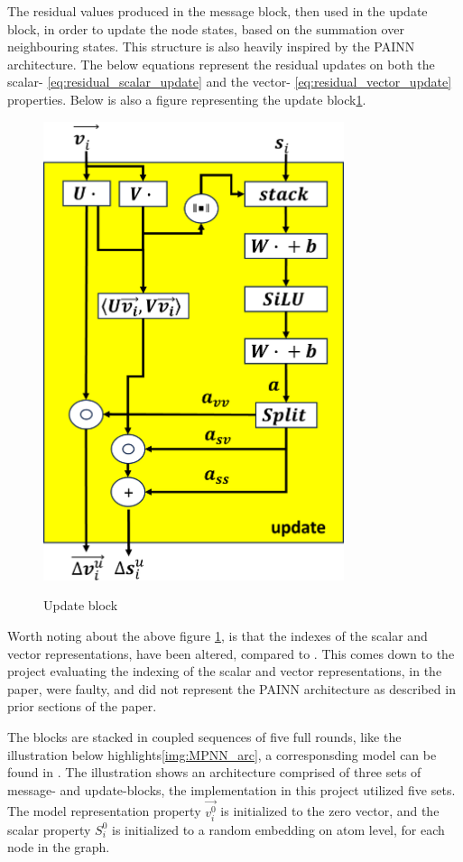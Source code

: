 The residual values produced in the message block, then used in the update block, in order to update the node states,
based on the summation over neighbouring states.
This structure is also heavily inspired by the PAINN architecture\cite{PAINN}. The below equations represent the residual updates
on both the scalar- \ref{eq:residual_scalar_update} and the vector- \ref{eq:residual_vector_update} properties. Below is also
a figure representing the update block\ref{img:update_block}.


\begin{figure}[H]
    \caption{Update block}
    \centering\label{img:update_block}
    \includegraphics[width=250pt]{Images/Method/update_block.png}
\end{figure}

Worth noting about the above figure \ref{img:update_block}, is that the indexes of the scalar and vector representations,
have been altered, compared to \cite{PAINN}. This comes down to the project evaluating the indexing of the scalar and vector
representations, in the paper, were faulty, and did not represent the PAINN architecture as described in prior sections of the
paper.

The blocks are stacked in coupled sequences of five full rounds, like the illustration below highlights\ref{img:MPNN_arc}, a corresponsding model can be found
in \cite{PAINN}. The illustration shows an architecture comprised of three sets of message- and update-blocks, the implementation in this project utilized
five sets. The model representation property $\vec{v_i^{0}}$ is initialized to the zero vector, and the scalar property $S_{i}^{0}$
is initialized to a random embedding on atom level, for each node in the graph.


